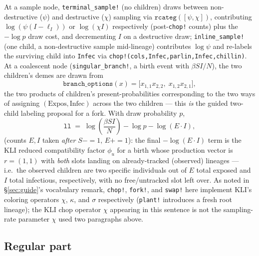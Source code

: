 \documentclass[11pt]{article}
\theoremstyle{plain}
\begin{document}
At a sample node, \texttt{terminal\_sample!} (no children) draws between non-destructive ($\psi$)
and destructive ($\chi$) sampling via $\texttt{rcateg}([\psi,\chi])$, contributing
$\log(\psi(I-\ell_I))$ or $\log(\chi I)$ respectively (post-\texttt{chop!} counts) plus the
$-\log p$ draw cost, and decrementing $I$ on a destructive draw; \texttt{inline\_sample!} (one
child, a non-destructive sample mid-lineage) contributes $\log\psi$ and re-labels the surviving
child into \texttt{Infec} via \texttt{chop!(cols,Infec,parlin,Infec,chillin)}. At a coalescent node
(\texttt{singular\_branch!}, a birth event with $\beta S I/N$), the two children's demes are drawn
from
\[
\texttt{branch\_options}(x) = \bigl[x_{1,1}x_{2,2},\; x_{1,2}x_{2,1}\bigr],
\]
the two products of children's present-probabilities corresponding to the two ways of assigning
$(\text{Expos},\text{Infec})$ across the two children --- this \emph{is} the guided two-child
labeling proposal for a fork. With draw probability $p$,
\[
\texttt{ll} \;=\; \log\!\left(\frac{\beta S I}{N}\right) - \log p - \log(E\cdot I),
\]
(counts $E,I$ taken \emph{after} $S{-}{=}1,\,E{+}{=}1$): the final $-\log(E\cdot I)$ term is the
KLI reduced compatibility factor $\phi_u$ for a birth whose production vector is $r=(1,1)$ with
\emph{both} slots landing on already-tracked (observed) lineages --- i.e.\ the observed children
are two specific individuals out of $E$ total exposed and $I$ total infectious, respectively, with
no free/untracked slot left over. As noted in \S\ref{sec:guide}'s vocabulary remark,
\texttt{chop!}, \texttt{fork!}, and \texttt{swap!} here implement KLI's coloring operators $\chi$,
$\kappa$, and $\sigma$ respectively (\texttt{plant!} introduces a fresh root lineage); the KLI chop
operator $\chi$ appearing in this sentence is not the sampling-rate parameter $\chi$ used two
paragraphs above.

\subsection{Regular part}
\end{document}
